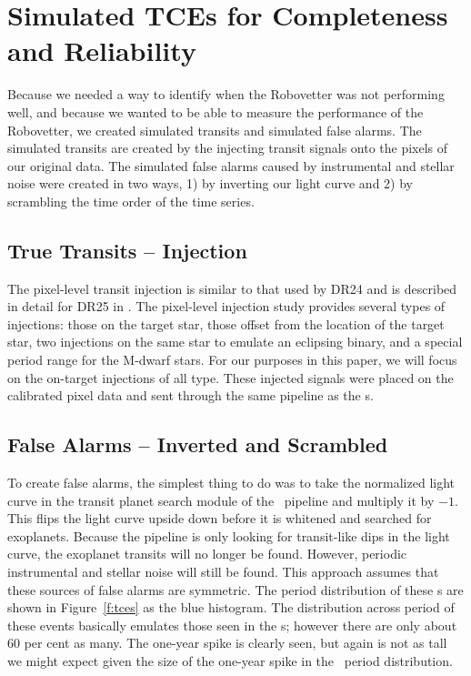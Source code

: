 \section{Simulated TCEs for Completeness and Reliability}
\label{s:simulated}
Because we needed a way to identify when the Robovetter was not performing well, and because we wanted to be able to measure the performance of the Robovetter, we created simulated transits and simulated false alarms. The simulated transits are created by the injecting transit signals onto the pixels of our original data.  The simulated false alarms caused by instrumental and stellar noise were created in two ways, 1) by inverting our light curve and 2) by scrambling the time order of the time series.  


\subsection{True Transits -- Injection}
\label{injectsec}
The pixel-level transit injection is similar to that used by DR24 \citep{Christiansen2016} and is described in detail for DR25 in \citep{Christiansen2017}. The pixel-level injection study provides several types of injections: those on the target star, those offset from the location of the target star, two injections on the same star to emulate an eclipsing binary, and a special period range for the M-dwarf stars.  For our purposes in this paper, we will focus on the on-target injections of all type.  These injected signals were placed on the calibrated pixel data and sent through the same \Kepler{} pipeline as the \opstce s.


\subsection{False Alarms -- Inverted and Scrambled} 

To create false alarms, the simplest thing to do was to take the normalized light curve in the transit planet search module of the \Kepler\ pipeline and multiply it by $-1$.  This flips the light curve upside down before it is whitened and searched for exoplanets.  Because the pipeline is only looking for transit-like dips in the light curve, the exoplanet transits will no longer be found. However, periodic instrumental and stellar noise will still be found.  This approach assumes that these sources of false alarms are symmetric. The period distribution of these \invtce s are shown in Figure~\ref{f:tces} as the blue histogram.  The distribution across period of these events basically emulates those seen in the \opstce s; however there are only about 60 per cent as many.  The one-year spike is clearly seen, but again is not as tall we might expect given the size of the one-year spike in the \opstce\ period distribution. 

